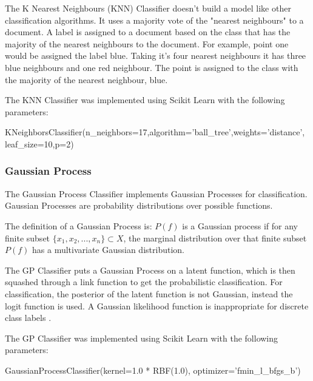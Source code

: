 The K Nearest Neighbours (KNN) Classifier doesn't build a model like other classification algorithms. It uses a majority vote of the "nearest neighbours" to a document. A label is assigned to a document based on the class that has the majority of the nearest neighbours to the document. For example, point one would be assigned the label blue. Taking it's four nearest neighbours it has three blue neighbours and one red neighbour. The point is assigned to the class with the majority of the nearest neighbour, blue.

The KNN Classifier was implemented using Scikit Learn with the following parameters:

\begin{tcolorbox}
\begin{center}
	KNeighborsClassifier(n\_neighbors=17,algorithm='ball\_tree',weights='distance',
	leaf\_size=10,p=2)
\end{center}
\end{tcolorbox}

\subsubsection*{Gaussian Process}

The Gaussian Process Classifier implements Gaussian Processes for classification. Gaussian Processes are probability distributions over possible functions.

The definition of a Gaussian Process is: $P(f)$ is a Gaussian process if for any finite subset $\{x_1,x_2,...,x_n\} \subset X$, the marginal distribution over that finite subset $P(f)$ has a multivariate Gaussian distribution.

The GP Classifier puts a Gaussian Process on a latent function, which is then squashed through a link function to get the probabilistic classification. For classification, the posterior of the latent function is not Gaussian, instead the logit function is used. A Gaussian likelihood function is inappropriate for discrete class labels \cite{gaussianProcesses2006}.

The GP Classifier was implemented using Scikit Learn with the following parameters:

\begin{tcolorbox}
\begin{center}
	GaussianProcessClassifier(kernel=1.0 * RBF(1.0), optimizer='fmin\_l\_bfgs\_b')
\end{center}
\end{tcolorbox}

